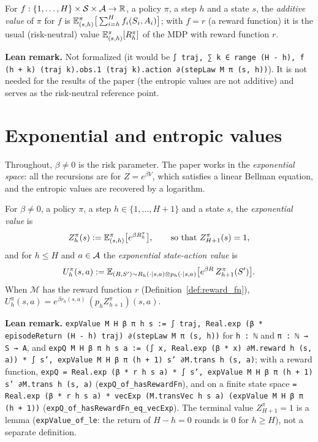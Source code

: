 \begin{definition}\label{def:eval_value}
For $f : \{1, \dots, H\} \times \mathcal{S} \times \mathcal{A} \to \mathbb{R}$, a policy $\pi$, a step $h$ and a state $s$,
the \emph{additive value} of $\pi$ for $f$ is
$\mathbb{E}^\pi_{(s, h)}\big[\sum_{i = h}^H f_i(S_i, A_i)\big]$; with $f = r$ (a reward function) it is the
usual (risk-neutral) value $\mathbb{E}^\pi_{(s, h)}[R^\pi_h]$ of the MDP with reward function $r$.
\end{definition}

\textbf{Lean remark.} Not formalized (it would be
\texttt{∫ traj, ∑ k ∈ range (H - h), f (h + k) (traj k).obs.1 (traj k).action ∂(stepLaw M π (s, h))}).
It is not needed for the results of the paper (the entropic values are not additive) and
serves as the risk-neutral reference point.

\section{Exponential and entropic values}
\label{sec:mdp_values}

Throughout, $\beta \ne 0$ is the risk parameter. The paper works in the \emph{exponential space}:
all the recursions are for $Z = e^{\beta V}$, which satisfies a linear Bellman equation, and the
entropic values are recovered by a logarithm.

\begin{definition}\label{def:exp_value}
\leanok
{}
For $\beta \ne 0$, a policy $\pi$, a step $h \in \{1, \dots, H + 1\}$ and a state $s$, the
\emph{exponential value} is
\[
  Z^\pi_h(s) := \mathbb{E}^\pi_{(s, h)}\big[e^{\beta R^\pi_h}\big] ,
  \qquad\text{so that } Z^\pi_{H+1}(s) = 1 ,
\]
and for $h \le H$ and $a \in \mathcal{A}$ the \emph{exponential state-action value} is
\[
  U^\pi_h(s, a) := \mathbb{E}_{(R, S') \sim R_h(\cdot \mid s, a) \otimes p_h(\cdot \mid s, a)}
    \big[e^{\beta R}\, Z^\pi_{h+1}(S')\big] .
\]
When $\mathcal M$ has the reward function $r$ (Definition~\ref{def:reward_fn}),
$U^\pi_h(s, a) = e^{\beta r_h(s, a)}\,(p_h Z^\pi_{h+1})(s, a)$.
\end{definition}

\textbf{Lean remark.} \texttt{expValue M H β π h s := ∫ traj, Real.exp (β * episodeReturn (H - h) traj) ∂(stepLaw M π (s, h))}
for \texttt{h : ℕ} and \texttt{π : ℕ → S → A}, and
\texttt{expQ M H β π h s a := (∫ x, Real.exp (β * x) ∂M.reward h (s, a)) * ∫ s', expValue M H β π (h + 1) s' ∂M.trans h (s, a)};
with a reward function, \texttt{expQ = Real.exp (β * r h s a) * ∫ s', expValue M H β π (h + 1) s' ∂M.trans h (s, a)}
(\texttt{expQ\_of\_hasRewardFn}), and on a finite state space
\texttt{= Real.exp (β * r h s a) * vecExp (M.transVec h s a) (expValue M H β π (h + 1))}
(\texttt{expQ\_of\_hasRewardFn\_eq\_vecExp}). The terminal value $Z^\pi_{H+1} = 1$ is a lemma
(\texttt{expValue\_of\_le}: the return of $H - h = 0$ rounds is $0$ for $h \ge H$), not a
separate definition.

